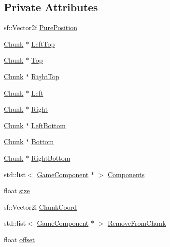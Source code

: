 \subsection*{Private Attributes}
\begin{DoxyCompactItemize}
\item 
sf\-::\-Vector2f \hyperlink{class_chunk_ace1577872b1189bc7fd88a9b3817ce98}{Pure\-Position}
\item 
\hyperlink{class_chunk}{Chunk} $\ast$ \hyperlink{class_chunk_a877d51226eaa97c40c05223987514d59}{Left\-Top}
\item 
\hyperlink{class_chunk}{Chunk} $\ast$ \hyperlink{class_chunk_ae841d5ab24dfa5ef8865cb4fa05d089d}{Top}
\item 
\hyperlink{class_chunk}{Chunk} $\ast$ \hyperlink{class_chunk_a8a7593c89d4fe5ed193e68b9ed40016b}{Right\-Top}
\item 
\hyperlink{class_chunk}{Chunk} $\ast$ \hyperlink{class_chunk_aee27c2584364a58dc8811e9ada0695dd}{Left}
\item 
\hyperlink{class_chunk}{Chunk} $\ast$ \hyperlink{class_chunk_a0bcf134e2aba0ca49370272c2b3f17a4}{Right}
\item 
\hyperlink{class_chunk}{Chunk} $\ast$ \hyperlink{class_chunk_af3577f37139ffeb74181d9ce3c48f5e6}{Left\-Bottom}
\item 
\hyperlink{class_chunk}{Chunk} $\ast$ \hyperlink{class_chunk_ac9ac53a727ae045b6f751ec6a68bcaca}{Bottom}
\item 
\hyperlink{class_chunk}{Chunk} $\ast$ \hyperlink{class_chunk_afded01a9a67540c9f64dde5776021f4b}{Right\-Bottom}
\item 
std\-::list$<$ \hyperlink{class_game_component}{Game\-Component} $\ast$ $>$ \hyperlink{class_chunk_a4cdf6febd96ff99b681e37d548617a38}{Components}
\item 
float \hyperlink{class_chunk_af46410b580baf2985b01044d5c041b2e}{size}
\item 
sf\-::\-Vector2i \hyperlink{class_chunk_abb5b1842148b3d7c616065766bfd2b33}{Chunk\-Coord}
\item 
std\-::list$<$ \hyperlink{class_game_component}{Game\-Component} $\ast$ $>$ \hyperlink{class_chunk_adf6692fdab4518524e217cc0ef09d282}{Remove\-From\-Chunk}
\item 
float \hyperlink{class_chunk_a6ab7f8f3970c886a62ccc1630bc60a16}{offset}
\end{DoxyCompactItemize}


